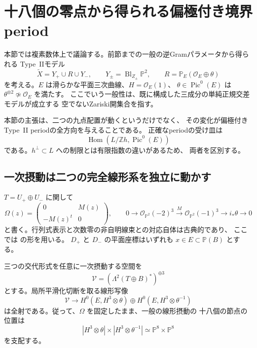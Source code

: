 \section{十八個の零点から得られる偏極付き境界period}
\label{sec:period-realization-v30}

本節では複素数体上で議論する。前節までの一般の逆Gramパラメータから得られる
Type~IIモデル
\[
 \widetilde X=Y_+\cup R\cup Y_-,\qquad
 Y_\pm=\operatorname{Bl}_{Z_\pm}\mathbb P^2,
 \qquad R=\mathbb P_E(\mathcal O_E\oplus\theta)
\]
を考える。$E$ は滑らかな平面三次曲線、$H=\mathcal O_E(1)$、
$\theta\in\operatorname{Pic}^0(E)$ は
$\theta^{\otimes2}\not\simeq\mathcal O_E$ を満たす。
ここでいう一般性は、既に構成した三成分の単純正規交差モデルが成立する
空でないZariski開集合を指す。

本節の主張は、二つの九点配置が動くというだけでなく、
その変化が偏極付きType~II periodの全方向を与えることである。
正確なperiodの受け皿は
\[
 \operatorname{Hom}(L/\mathbb Zh,\operatorname{Pic}^0(E))
\]
である。$h^\perp\subset L$ への制限とは有限指数の違いがあるため、
両者を区別する。

\subsection{一次摂動は二つの完全線形系を独立に動かす}

$T=U_+\oplus U_-$ に関して
\[
 \Omega(z)=\begin{pmatrix}0&M(z)\\-M(z)^t&0\end{pmatrix},
 \qquad
 0\longrightarrow\mathcal O_{\mathbb P^2}(-2)^3
 \xrightarrow{M}\mathcal O_{\mathbb P^2}(-1)^3
 \longrightarrow i_*\theta\longrightarrow0
\]
と書く。行列式表示と次数零の非自明線束との対応自体は古典的であり、
ここでは \cite[Propositions~3.1, 3.3]{BeauvilleDeterminantal} の形を用いる。
$D_+$ と $D_-$ の平面座標はいずれも $x\in E\subset\mathbb P(B)$ とする。

\begin{theorem}[平滑化切断の全射性]
\label{thm:full-t1-v30}
三つの交代形式を任意に一次摂動する空間を
\[
 \mathcal V=(\Lambda^2(T\oplus B)^*)^{\oplus3}
\]
とする。局所平滑化切断を取る線形写像
\begin{equation}
 \mathcal V\longrightarrow
 H^0(E,H^3\otimes\theta)\oplus
 H^0(E,H^3\otimes\theta^{-1})
 \label{eq:full-t1-v30}
\end{equation}
は全射である。従って、$\Omega$ を固定したまま、一般の線形摂動の
十八個の節点の位置は
\[
 |H^3\otimes\theta|\times|H^3\otimes\theta^{-1}|
 \simeq\mathbb P^8\times\mathbb P^8
\]
を支配する。
\end{theorem}

